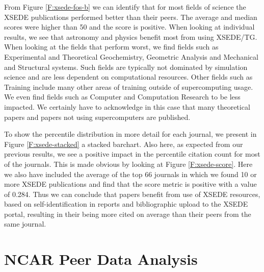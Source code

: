 \documentclass[10pt, conference, compsocconf]{IEEEtran}
\begin{document}
From Figure \ref{F:xsede-fos-b} we can identify that for most fields of science the XSEDE publications performed better than their peers. The average and median scores were higher than 50 and the score is positive. When looking at individual results, we see that astronomy and physics benefit most from using XSEDE/TG. When looking at the fields that perform worst, we find fields such as Experimental and Theoretical Geochemistry, Geometric Analysis and Mechanical and Structural systems. Such fields are typically not dominated by simulation science and are less dependent on computational resources. Other fields such as Training include many other areas of training outside of supercomputing usage. We even find fields such as Computer and Computation Research to be less impacted. We certainly have to acknowledge in this case that many theoretical papers and papers not using supercomputers are published. 

To show the percentile distribution in more detail for each journal, we present in Figure \ref{F:xsede-stacked} a stacked barchart. Also here, as expected from our previous results, we see a positive impact in the percentile citation count for most of the journals. This is made obvious by looking at Figure \ref{F:xsede-score}. Here we also have included the average of the top 66 journals in which we found 10 or more XSEDE publications and find that the score metric is positive with a value of 0.284. Thus we can conclude that papers benefit from use of XSEDE resources, based on self-identification in reports and bibliographic upload to the XSEDE portal, resulting in their being more cited on average than their peers from the same journal.

\section{NCAR Peer Data Analysis}\label{S:ncar}
\end{document}

